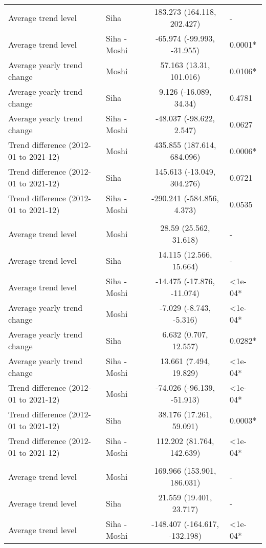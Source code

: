 \begin{longtable}{l|lcl}
Average trend level & Siha & 183.273 (164.118, 202.427) & - \\ 
Average trend level & Siha - Moshi & -65.974 (-99.993, -31.955) & 0.0001* \\ 
Average yearly trend change & Moshi & 57.163 (13.31, 101.016) & 0.0106* \\ 
Average yearly trend change & Siha & 9.126 (-16.089, 34.34) & 0.4781 \\ 
Average yearly trend change & Siha - Moshi & -48.037 (-98.622, 2.547) & 0.0627 \\ 
Trend difference (2012-01 to 2021-12) & Moshi & 435.855 (187.614, 684.096) & 0.0006* \\ 
Trend difference (2012-01 to 2021-12) & Siha & 145.613 (-13.049, 304.276) & 0.0721 \\ 
Trend difference (2012-01 to 2021-12) & Siha - Moshi & -290.241 (-584.856, 4.373) & 0.0535 \\ 
\midrule\addlinespace[2.5pt]
\multicolumn{4}{l}{Poisoning} \\[2.5pt] 
\midrule\addlinespace[2.5pt]
Average trend level & Moshi & 28.59 (25.562, 31.618) & - \\ 
Average trend level & Siha & 14.115 (12.566, 15.664) & - \\ 
Average trend level & Siha - Moshi & -14.475 (-17.876, -11.074) & <1e-04* \\ 
Average yearly trend change & Moshi & -7.029 (-8.743, -5.316) & <1e-04* \\ 
Average yearly trend change & Siha & 6.632 (0.707, 12.557) & 0.0282* \\ 
Average yearly trend change & Siha - Moshi & 13.661 (7.494, 19.829) & <1e-04* \\ 
Trend difference (2012-01 to 2021-12) & Moshi & -74.026 (-96.139, -51.913) & <1e-04* \\ 
Trend difference (2012-01 to 2021-12) & Siha & 38.176 (17.261, 59.091) & 0.0003* \\ 
Trend difference (2012-01 to 2021-12) & Siha - Moshi & 112.202 (81.764, 142.639) & <1e-04* \\ 
\midrule\addlinespace[2.5pt]
\multicolumn{4}{l}{Psychoses} \\[2.5pt] 
\midrule\addlinespace[2.5pt]
Average trend level & Moshi & 169.966 (153.901, 186.031) & - \\ 
Average trend level & Siha & 21.559 (19.401, 23.717) & - \\ 
Average trend level & Siha - Moshi & -148.407 (-164.617, -132.198) & <1e-04* \\ 

\end{longtable}

